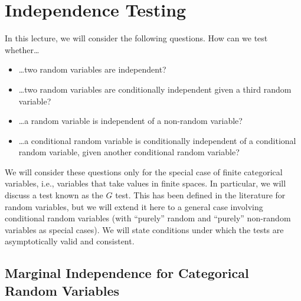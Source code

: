 \section{Independence Testing}

In this lecture, we will consider the following questions. How can we test whether\dots
\begin{itemize}
  \item \dots two random variables are independent?
  \item \dots two random variables are conditionally independent given a third random variable?
  \item \dots a random variable is independent of a non-random variable?
  \item \dots a conditional random variable is conditionally independent of a conditional random variable, given another conditional random variable?
\end{itemize}
We will consider these questions only for the special case of finite categorical variables, i.e., 
variables that take values in finite spaces. In particular, we will discuss a test known as the $G$ test.
This has been defined in the literature for random variables, but we will extend it here to a general case
involving conditional random variables (with ``purely'' random and ``purely'' non-random variables as special cases).
We will state conditions under which the tests are asymptotically valid and consistent.

\subsection{Marginal Independence for Categorical Random Variables}

